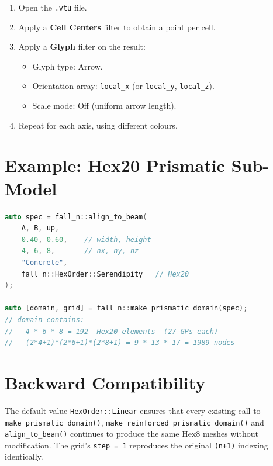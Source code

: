 \begin{enumerate}
  \item Open the \texttt{.vtu} file.
  \item Apply a \textbf{Cell Centers} filter to obtain a point per cell.
  \item Apply a \textbf{Glyph} filter on the result:
        \begin{itemize}
          \item Glyph type: Arrow.
          \item Orientation array: \texttt{local\_x} (or \texttt{local\_y},
                \texttt{local\_z}).
          \item Scale mode: Off (uniform arrow length).
        \end{itemize}
  \item Repeat for each axis, using different colours.
\end{enumerate}


\section{Example: Hex20 Prismatic Sub-Model}
\label{sec:ho-example}

\begin{lstlisting}[language=C++, basicstyle=\ttfamily\small]
auto spec = fall_n::align_to_beam(
    A, B, up,
    0.40, 0.60,    // width, height
    4, 6, 8,       // nx, ny, nz
    "Concrete",
    fall_n::HexOrder::Serendipity   // Hex20
);

auto [domain, grid] = fall_n::make_prismatic_domain(spec);
// domain contains:
//   4 * 6 * 8 = 192  Hex20 elements  (27 GPs each)
//   (2*4+1)*(2*6+1)*(2*8+1) = 9 * 13 * 17 = 1989 nodes
\end{lstlisting}


\section{Backward Compatibility}
\label{sec:ho-compat}

The default value \texttt{HexOrder::Linear} ensures that every existing
call to \texttt{make\_prismatic\_domain()},
\texttt{make\_reinforced\_prismatic\_domain()} and
\texttt{align\_to\_beam()} continues to produce the same Hex8 meshes
without modification.  The grid's \texttt{step = 1} reproduces the
original \texttt{(n+1)} indexing identically.
